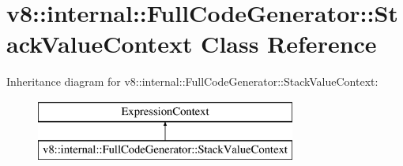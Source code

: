 \hypertarget{classv8_1_1internal_1_1_full_code_generator_1_1_stack_value_context}{}\section{v8\+:\+:internal\+:\+:Full\+Code\+Generator\+:\+:Stack\+Value\+Context Class Reference}
\label{classv8_1_1internal_1_1_full_code_generator_1_1_stack_value_context}
Inheritance diagram for v8\+:\+:internal\+:\+:Full\+Code\+Generator\+:\+:Stack\+Value\+Context\+:\begin{figure}[H]
\begin{center}
\leavevmode
\includegraphics[height=2.000000cm]{classv8_1_1internal_1_1_full_code_generator_1_1_stack_value_context}
\end{center}
\end{figure}
